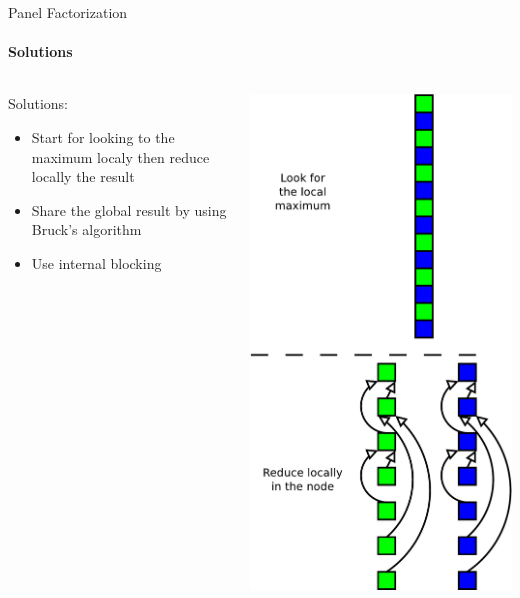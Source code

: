 \begin{frame}{Panel Factorization}
\framesubtitle{Solutions}
\begin{columns}
\begin{column}{.60\textwidth}
Solutions:
\begin{itemize}
\item Start for looking to the maximum localy then reduce locally the result
\item Share the global result by using Bruck's algorithm
\item Use internal blocking
\end{itemize}
\end{column}
\hfill
\begin{column}{.30\textwidth}
\includegraphics[scale=0.2]{binary_reduction.pdf}
\end{column}
\end{columns}
\end{frame}


